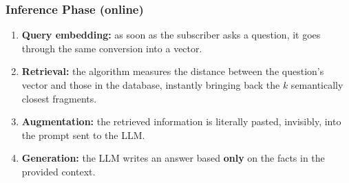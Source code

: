 \documentclass[12pt, a4paper]{report}
\newcommand{\humantext}[1]{#1}      %
\begin{document}
\subsubsection{Inference Phase (online)}
\begin{enumerate}[noitemsep]
    \item \humantext{\textbf{Query embedding:} as soon as the subscriber asks a question, it goes through the same conversion into a vector.}
    \item \humantext{\textbf{Retrieval:} the algorithm measures the distance between the question's vector and those in the database, instantly bringing back the $k$ semantically closest fragments.}
    \item \humantext{\textbf{Augmentation:} the retrieved information is literally pasted, invisibly, into the prompt sent to the LLM.}
    \item \humantext{\textbf{Generation:} the LLM writes an answer based \textbf{only} on the facts in the provided context.}
\end{enumerate}
\end{document}
